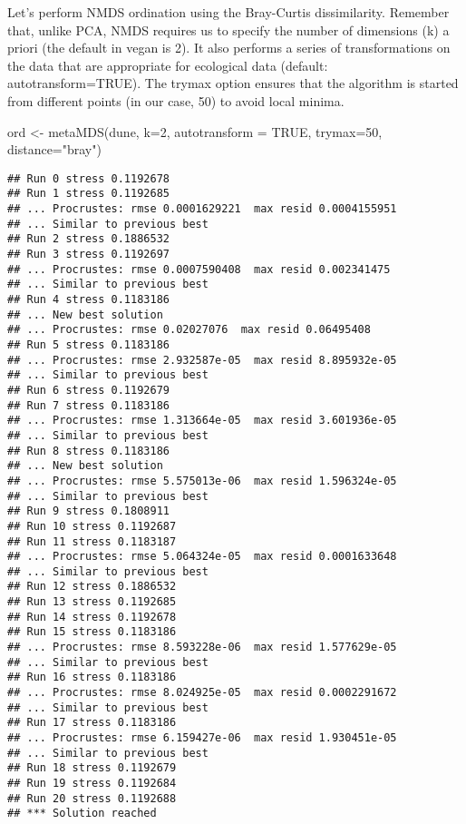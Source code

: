 \documentclass[
]{book}
\newenvironment{Shaded}{\begin{snugshade}}{\end{snugshade}}
\newcommand{\AttributeTok}[1]{\textcolor[rgb]{0.77,0.63,0.00}{#1}}
\newcommand{\ConstantTok}[1]{\textcolor[rgb]{0.00,0.00,0.00}{#1}}
\newcommand{\DecValTok}[1]{\textcolor[rgb]{0.00,0.00,0.81}{#1}}
\newcommand{\FunctionTok}[1]{\textcolor[rgb]{0.00,0.00,0.00}{#1}}
\newcommand{\NormalTok}[1]{#1}
\newcommand{\OtherTok}[1]{\textcolor[rgb]{0.56,0.35,0.01}{#1}}
\newcommand{\StringTok}[1]{\textcolor[rgb]{0.31,0.60,0.02}{#1}}
\begin{document}
Let's perform NMDS ordination using the Bray-Curtis dissimilarity. Remember that, unlike PCA, NMDS requires us to specify the number of dimensions (k) a priori (the default in vegan is 2). It also performs a series of transformations on the data that are appropriate for ecological data (default: autotransform=TRUE). The trymax option ensures that the algorithm is started from different points (in our case, 50) to avoid local minima.

\begin{Shaded}
\begin{Highlighting}[]
\NormalTok{ord }\OtherTok{\textless{}{-}} \FunctionTok{metaMDS}\NormalTok{(dune, }\AttributeTok{k=}\DecValTok{2}\NormalTok{, }\AttributeTok{autotransform =} \ConstantTok{TRUE}\NormalTok{, }\AttributeTok{trymax=}\DecValTok{50}\NormalTok{, }\AttributeTok{distance=}\StringTok{"bray"}\NormalTok{)}
\end{Highlighting}
\end{Shaded}

\begin{verbatim}
## Run 0 stress 0.1192678 
## Run 1 stress 0.1192685 
## ... Procrustes: rmse 0.0001629221  max resid 0.0004155951 
## ... Similar to previous best
## Run 2 stress 0.1886532 
## Run 3 stress 0.1192697 
## ... Procrustes: rmse 0.0007590408  max resid 0.002341475 
## ... Similar to previous best
## Run 4 stress 0.1183186 
## ... New best solution
## ... Procrustes: rmse 0.02027076  max resid 0.06495408 
## Run 5 stress 0.1183186 
## ... Procrustes: rmse 2.932587e-05  max resid 8.895932e-05 
## ... Similar to previous best
## Run 6 stress 0.1192679 
## Run 7 stress 0.1183186 
## ... Procrustes: rmse 1.313664e-05  max resid 3.601936e-05 
## ... Similar to previous best
## Run 8 stress 0.1183186 
## ... New best solution
## ... Procrustes: rmse 5.575013e-06  max resid 1.596324e-05 
## ... Similar to previous best
## Run 9 stress 0.1808911 
## Run 10 stress 0.1192687 
## Run 11 stress 0.1183187 
## ... Procrustes: rmse 5.064324e-05  max resid 0.0001633648 
## ... Similar to previous best
## Run 12 stress 0.1886532 
## Run 13 stress 0.1192685 
## Run 14 stress 0.1192678 
## Run 15 stress 0.1183186 
## ... Procrustes: rmse 8.593228e-06  max resid 1.577629e-05 
## ... Similar to previous best
## Run 16 stress 0.1183186 
## ... Procrustes: rmse 8.024925e-05  max resid 0.0002291672 
## ... Similar to previous best
## Run 17 stress 0.1183186 
## ... Procrustes: rmse 6.159427e-06  max resid 1.930451e-05 
## ... Similar to previous best
## Run 18 stress 0.1192679 
## Run 19 stress 0.1192684 
## Run 20 stress 0.1192688 
## *** Solution reached
\end{verbatim}
\end{document}
